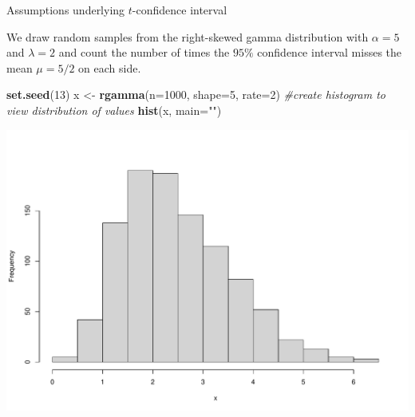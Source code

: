 \documentclass[
  ignorenonframetext,
]{beamer}
\newenvironment{Shaded}{\begin{snugshade}}{\end{snugshade}}
\newcommand{\AttributeTok}[1]{\textcolor[rgb]{0.13,0.29,0.53}{#1}}
\newcommand{\CommentTok}[1]{\textcolor[rgb]{0.56,0.35,0.01}{\textit{#1}}}
\newcommand{\DecValTok}[1]{\textcolor[rgb]{0.00,0.00,0.81}{#1}}
\newcommand{\FunctionTok}[1]{\textcolor[rgb]{0.13,0.29,0.53}{\textbf{#1}}}
\newcommand{\NormalTok}[1]{#1}
\newcommand{\OtherTok}[1]{\textcolor[rgb]{0.56,0.35,0.01}{#1}}
\newcommand{\StringTok}[1]{\textcolor[rgb]{0.31,0.60,0.02}{#1}}
\begin{document}
\begin{frame}[fragile]{Assumptions underlying \(t\)-confidence interval}
\protect\hypertarget{assumptions-underlying-t-confidence-interval-2}{}
\begin{tcolorbox}
We draw random samples from the right-skewed gamma distribution with $\alpha=5$ and $\lambda=2$ and count the number of times the $95\%$ confidence interval misses the mean $\mu=5/2$ on each side.
\end{tcolorbox}

\tiny

\begin{Shaded}
\begin{Highlighting}[]
\FunctionTok{set.seed}\NormalTok{(}\DecValTok{13}\NormalTok{)}
\NormalTok{x }\OtherTok{\textless{}{-}} \FunctionTok{rgamma}\NormalTok{(}\AttributeTok{n=}\DecValTok{1000}\NormalTok{, }\AttributeTok{shape=}\DecValTok{5}\NormalTok{, }\AttributeTok{rate=}\DecValTok{2}\NormalTok{)}
\CommentTok{\#create histogram to view distribution of values}
\FunctionTok{hist}\NormalTok{(x, }\AttributeTok{main=}\StringTok{""}\NormalTok{)}
\end{Highlighting}
\end{Shaded}

\begin{center}\includegraphics[width=0.6\linewidth,height=0.4\textheight]{Week10_Lect_files/figure-beamer/unnamed-chunk-63-1} \end{center}
\normalsize
\end{frame}
\end{document}
